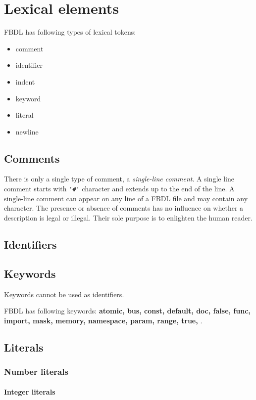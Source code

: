 \chapter{Lexical elements}

FBDL has following types of lexical tokens:
\begin{itemize}
	\item comment
	\item identifier
	\item indent
	\item keyword
	\item literal
	\item newline
\end{itemize}

\section{Comments}

There is only a single type of comment, a \textit{single-line comment}.
A single line comment starts with \lstinline{'#'} character and extends up to the end of the line.
A single-line comment can appear on any line of a FBDL file and may contain any character.
The presence or absence of comments has no influence on whether a description is legal or illegal.
Their sole purpose is to enlighten the human reader.

\section{Identifiers}

\section{Keywords}

Keywords cannot be used as identifiers.

FBDL has following keywords: \textbf{
atomic,
bus,
const,
default,
doc,
false,
func,
import,
mask,
memory,
namespace,
param,
range,
true,
}.

\section{Literals}

\subsection{Number literals}

\subsubsection{Integer literals}

